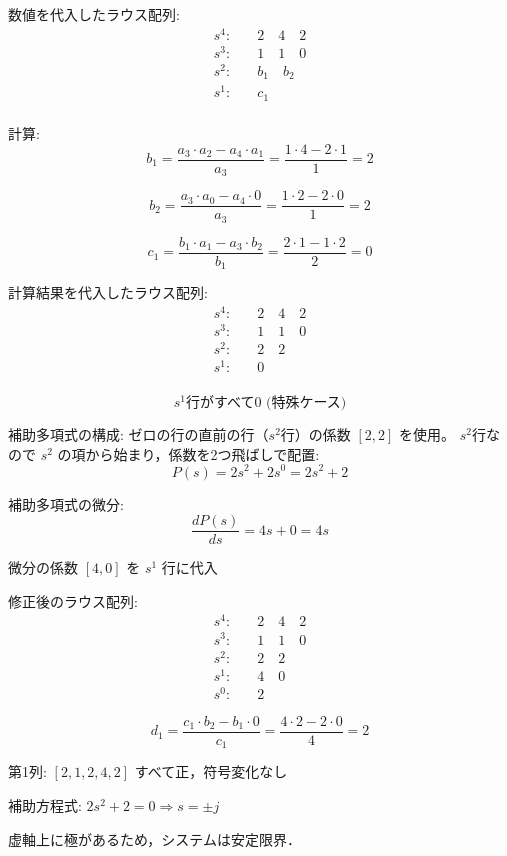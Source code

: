 \documentclass[11pt,a4paper]{ltjsarticle}
\begin{document}
数値を代入したラウス配列:
\begin{align*}
s^4: & \quad 2 \quad 4 \quad 2 \\
s^3: & \quad 1 \quad 1 \quad 0 \\
s^2: & \quad b_1 \quad b_2 \\
s^1: & \quad c_1 \\
\end{align*}

計算:
$$b_1 = \frac{a_3 \cdot a_2 - a_4 \cdot a_1}{a_3} = \frac{1 \cdot 4 - 2 \cdot 1}{1} = 2$$

$$b_2 = \frac{a_3 \cdot a_0 - a_4 \cdot 0}{a_3} = \frac{1 \cdot 2 - 2 \cdot 0}{1} = 2$$

$$c_1 = \frac{b_1 \cdot a_1 - a_3 \cdot b_2}{b_1} = \frac{2 \cdot 1 - 1 \cdot 2}{2} = 0$$

計算結果を代入したラウス配列:
\begin{align*}
s^4: & \quad 2 \quad 4 \quad 2 \\
s^3: & \quad 1 \quad 1 \quad 0 \\
s^2: & \quad 2 \quad 2 \\
s^1: & \quad 0 \\
\end{align*}

$$s^1\text{行がすべて}0 \text{ (特殊ケース)}$$

補助多項式の構成:
ゼロの行の直前の行（$s^2$行）の係数 $[2, 2]$ を使用。
$s^2$行なので $s^2$ の項から始まり，係数を2つ飛ばしで配置:
$$P(s) = 2s^2 + 2s^0 = 2s^2 + 2$$

補助多項式の微分:
$$\frac{dP(s)}{ds} = 4s + 0 = 4s$$

微分の係数 $[4, 0]$ を $s^1$ 行に代入

修正後のラウス配列:
\begin{align*}
s^4: & \quad 2 \quad 4 \quad 2 \\
s^3: & \quad 1 \quad 1 \quad 0 \\
s^2: & \quad 2 \quad 2 \\
s^1: & \quad 4 \quad 0 \\
s^0: & \quad 2
\end{align*}

$$d_1 = \frac{c_1 \cdot b_2 - b_1 \cdot 0}{c_1} = \frac{4 \cdot 2 - 2 \cdot 0}{4} = 2$$

第1列: $[2, 1, 2, 4, 2]$ すべて正，符号変化なし

補助方程式: $2s^2+2=0 \Rightarrow s=\pm j$

虚軸上に極があるため，システムは安定限界．
\end{document}
